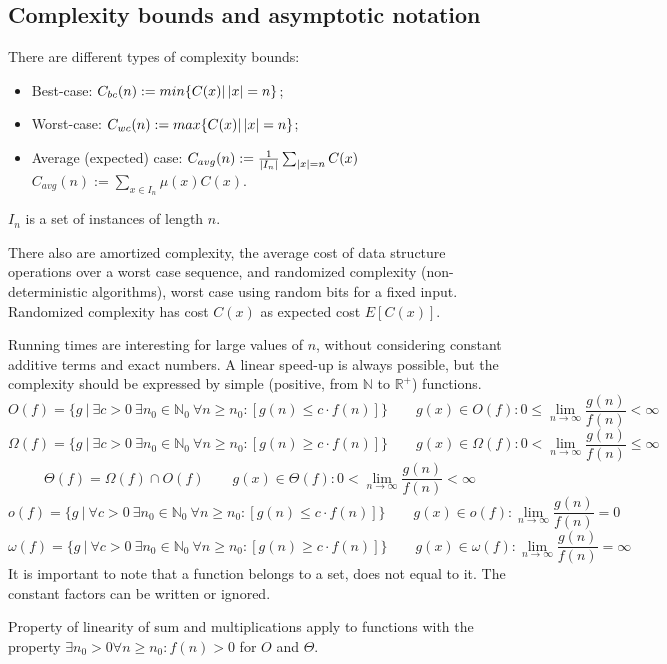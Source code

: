 \subsection{Complexity bounds and asymptotic notation}
There are different types of complexity bounds:
\begin{itemize}
	\item Best-case: $C_{bc}(n) := min\{C(x) | \left|x\right| = n\}$;
	\item Worst-case: $C_{wc}(n) := max\{C(x) | \left|x\right| = n\}$;
	\item Average (expected) case: $C_{avg}(n) := \frac{1}{\left|I_n\right|} \sum_{\left|x\right| = n} C(x)$ \\
	$C_{avg}(n) := \sum_{x \in I_n} \mu(x) C(x)$.
\end{itemize}
$I_n$ is a set of instances of length $n$.

There also are amortized complexity, the average cost of data structure operations over a worst case sequence, and randomized complexity (non-deterministic algorithms), worst case using random bits for a fixed input. Randomized complexity has cost $C(x)$ as expected cost $E[C(x)]$.

Running times are interesting for large values of $n$, without considering constant additive terms and exact numbers. A linear speed-up is always possible, but the complexity should be expressed by simple (positive, from $\mathbb{N}$ to $\mathbb{R}^+$) functions.
$$O(f) = \{g\ |\ \exists c > 0\ \exists n_0 \in \mathbb{N}_0\ \forall n \geq n_0 : [g(n) \leq c \cdot f(n)]\} \qquad g(x) \in O(f): 0 \leq \lim\limits_{n \rightarrow \infty} \frac{g(n)}{f(n)} < \infty$$
$$\Omega(f) = \{g\ |\ \exists c > 0\ \exists n_0 \in \mathbb{N}_0\ \forall n \geq n_0 : [g(n) \geq c \cdot f(n)]\} \qquad g(x) \in \Omega(f): 0 < \lim\limits_{n \rightarrow \infty} \frac{g(n)}{f(n)} \leq \infty$$
$$\Theta(f) = \Omega(f) \cap O(f) \qquad g(x) \in \Theta(f): 0 < \lim\limits_{n \rightarrow \infty} \frac{g(n)}{f(n)} < \infty$$
$$o(f) = \{g\ |\ \forall c > 0\ \exists n_0 \in \mathbb{N}_0\ \forall n \geq n_0 : [g(n) \leq c \cdot f(n)]\} \qquad g(x) \in o(f): \lim\limits_{n \rightarrow \infty} \frac{g(n)}{f(n)} = 0$$
$$\omega(f) = \{g\ |\ \forall c > 0\ \exists n_0 \in \mathbb{N}_0\ \forall n \geq n_0 : [g(n) \geq c \cdot f(n)]\} \qquad g(x) \in \omega(f): \lim\limits_{n \rightarrow \infty} \frac{g(n)}{f(n)} = \infty$$
It is important to note that a function belongs to a set, does not equal to it. The constant factors can be written or ignored.

Property of linearity of sum and multiplications apply to functions with the property $\exists n_0 > 0 \forall n \geq n_0 : f(n) > 0$ for $O$ and $\Theta$.

